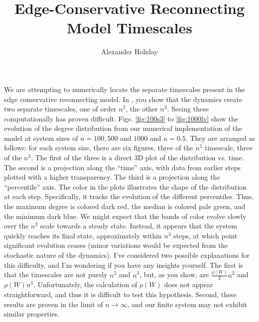 \documentclass[11pt]{article}
\begin{document}
\title{\vspace{-5mm}Edge-Conservative Reconnecting Model Timescales}
\author{Alexander Holiday}
\maketitle

We are attempting to numerically locate the separate timescales present in the edge conservative reconnecting model. In \cite{Rath2012}, you show that the dynamics create two separate timescales, one of order $n^{2}$, the other $n^{3}$. Seeing these computationally has proven difficult. Figs. \ref{fig:100s3} to \ref{fig:1000lv} show the evolution of the degree distribution from our numerical implementation of the model at system sizes of $n=100, 500$ and $1000$ and $\kappa = 0.5$. They are arranged as follows: for each system size, there are six figures, three of the $n^{2}$ timescale, three of the $n^{3}$. The first of the three is a direct 3D plot of the distribution vs. time. The second is a projection along the ``time'' axis, with data from earlier steps plotted with a higher transparency. The third is a projection along the ``percentile'' axis. The color in the plots illustrates the shape of the distribution at each step. Specifically, it tracks the evolution of the different percentiles. Thus, the maximum degree is colored dark red, the median is colored pale green, and the minimum dark blue. We might expect that the bands of color evolve slowly over the $n^{3}$ scale towards a steady state. Instead, it appears that the system quickly reaches its final state, approximately within $n^{3}$ steps, at which point significant evolution ceases (minor variations would be expected from the stochastic nature of the dynamics). I've considered two possible explanations for this difficulty, and I'm wondering if you have any insights yourself. The first is that the timescales are not purely $n^{2}$ and $n^{3}$, but, as you show, are $\frac{\rho(W)}{2} n^{2}$ and $\rho(W) n^{3}$. Unfortunately, the calculation of $\rho(W)$ does not appear straightforward, and thus it is difficult to test this hypothesis. Second, these results are proven in the limit of $n \rightarrow \infty$, and our finite system may not exhibit similar properties.



\begin{changemargin}{0.0cm}{0.0cm}
\centering



\end{changemargin}
\end{document}
